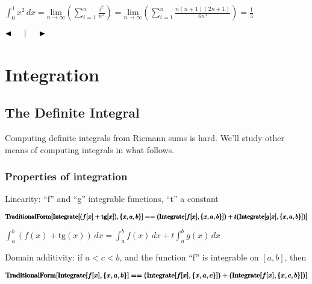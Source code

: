 \documentclass{article}
\begin{document}
\begin{doublespace}
\noindent\(\int_0^1 x^2 \, dx=\underset{n\to \infty }{\text{lim}}\left(\sum _{i=1}^n \frac{i^2}{n^3}\right)=\underset{n\to \infty }{\text{lim}}\left(\sum
_{i=1}^n \frac{n (n+1) (2 n+1)}{6 n^3}\right)=\frac{1}{3}\)
\end{doublespace}

$\blacktriangleleft \thickspace \thickspace \thickspace $$\thickspace \thickspace |\thickspace \thickspace $$\thickspace \thickspace \thickspace
\blacktriangleright $



\section*{Integration}

\subsection*{The Definite Integral}

Computing definite integrals from Riemann sums is hard. We{'}ll study other means of computing integrals in what follows. 

\subsubsection*{Properties of integration}

Linearity: {``}f{''} and {``}g{''} integrable functions, {``}t{''} a constant

\begin{doublespace}
\noindent\(\pmb{\text{TraditionalForm}[\text{Integrate}[(f[x]+\text{tg}[x]),\{x,a,b\}]== }\\
\pmb{(\text{Integrate}[f[x],\{x,a,b\}]) +t(\text{Integrate}[g[x],\{x,a,b\}])]}\)
\end{doublespace}

\begin{doublespace}
\noindent\(\int_a^b (f(x)+\text{tg}(x)) \, dx=\int_a^b f(x) \, dx+t \int_a^b g(x) \, dx\)
\end{doublespace}

Domain additivity: if \(a<c<b\), and the function {``}f{''} is integrable on \([a,b]\), then 

\begin{doublespace}
\noindent\(\pmb{\text{TraditionalForm}[\text{Integrate}[f[x],\{x,a,b\}]== }\\
\pmb{(\text{Integrate}[f[x],\{x,a,c\}]) +(\text{Integrate}[f[x],\{x,c,b\}])]}\)
\end{doublespace}
\end{document}
